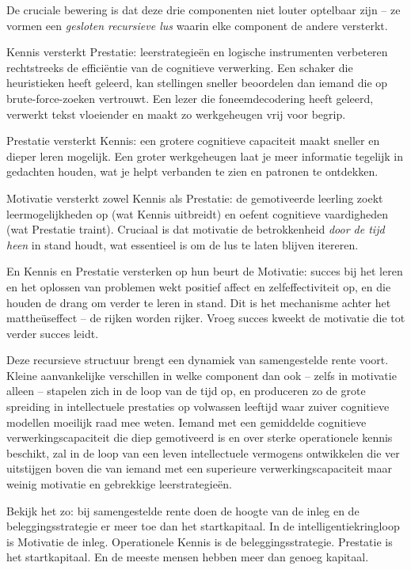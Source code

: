 \documentclass[11pt, twoside, openright]{book}
\begin{document}
De cruciale bewering is dat deze drie componenten niet louter optelbaar zijn -- ze vormen een \textit{gesloten recursieve lus} waarin elke component de andere versterkt.

Kennis versterkt Prestatie: leerstrategieën en logische instrumenten verbeteren rechtstreeks de efficiëntie van de cognitieve verwerking. Een schaker die heuristieken heeft geleerd, kan stellingen sneller beoordelen dan iemand die op brute-force-zoeken vertrouwt. Een lezer die foneemdecodering heeft geleerd, verwerkt tekst vloeiender en maakt zo werkgeheugen vrij voor begrip.

Prestatie versterkt Kennis: een grotere cognitieve capaciteit maakt sneller en dieper leren mogelijk. Een groter werkgeheugen laat je meer informatie tegelijk in gedachten houden, wat je helpt verbanden te zien en patronen te ontdekken.

Motivatie versterkt zowel Kennis als Prestatie: de gemotiveerde leerling zoekt leermogelijkheden op (wat Kennis uitbreidt) en oefent cognitieve vaardigheden (wat Prestatie traint). Cruciaal is dat motivatie de betrokkenheid \textit{door de tijd heen} in stand houdt, wat essentieel is om de lus te laten blijven itereren.

En Kennis en Prestatie versterken op hun beurt de Motivatie: succes bij het leren en het oplossen van problemen wekt positief affect en zelfeffectiviteit op, en die houden de drang om verder te leren in stand. Dit is het mechanisme achter het mattheüseffect -- de rijken worden rijker. Vroeg succes kweekt de motivatie die tot verder succes leidt.

Deze recursieve structuur brengt een dynamiek van samengestelde rente voort. Kleine aanvankelijke verschillen in welke component dan ook -- zelfs in motivatie alleen -- stapelen zich in de loop van de tijd op, en produceren zo de grote spreiding in intellectuele prestaties op volwassen leeftijd waar zuiver cognitieve modellen moeilijk raad mee weten. Iemand met een gemiddelde cognitieve verwerkingscapaciteit die diep gemotiveerd is en over sterke operationele kennis beschikt, zal in de loop van een leven intellectuele vermogens ontwikkelen die ver uitstijgen boven die van iemand met een superieure verwerkingscapaciteit maar weinig motivatie en gebrekkige leerstrategieën.

Bekijk het zo: bij samengestelde rente doen de hoogte van de inleg en de beleggingsstrategie er meer toe dan het startkapitaal. In de intelligentiekringloop is Motivatie de inleg. Operationele Kennis is de beleggingsstrategie. Prestatie is het startkapitaal. En de meeste mensen hebben meer dan genoeg kapitaal.
\end{document}
